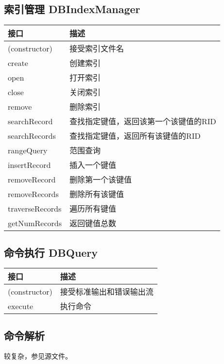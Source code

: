     \subsection{索引管理 DBIndexManager}
        \begin{tabularx}{\textwidth}{lX}
            \toprule
            接口 & 描述 \\
            \midrule
            (constructor) & 接受索引文件名 \\
            \midrule
            create & 创建索引 \\
            \midrule
            open & 打开索引 \\
            \midrule
            close & 关闭索引 \\
            \midrule
            remove & 删除索引 \\
            \midrule 
            searchRecord & 查找指定键值，返回该第一个该键值的RID \\
            \midrule
            searchRecords & 查找指定键值，返回所有该键值的RID \\
            \midrule
            rangeQuery & 范围查询 \\
            \midrule
            insertRecord & 插入一个键值 \\
            \midrule
            removeRecord & 删除第一个该键值 \\
            \midrule
            removeRecords & 删除所有该键值 \\
            \midrule
            traverseRecords & 遍历所有键值 \\
            \midrule
            getNumRecords & 返回键值总数 \\
            \bottomrule
        \end{tabularx}

    \subsection{命令执行 DBQuery}
        \begin{tabularx}{\textwidth}{lX}
            \toprule
            接口 & 描述 \\
            \midrule
            (constructor) & 接受标准输出和错误输出流 \\
            \midrule
            execute & 执行命令 \\
            \bottomrule
        \end{tabularx}

    \subsection{命令解析}
        较复杂，参见源文件。


